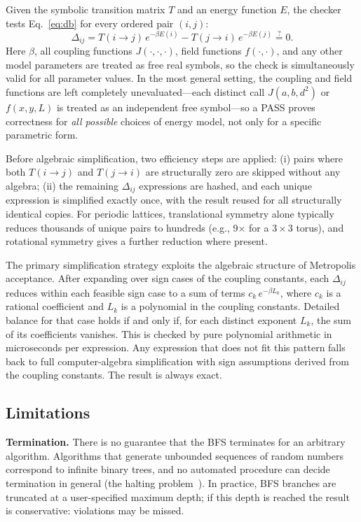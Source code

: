 \documentclass[twocolumn,10pt]{article}
\begin{document}
Given the symbolic transition matrix $T$ and an energy function $E$, the
checker tests Eq.~\eqref{eq:db} for every ordered pair $(i,j)$:
\begin{equation}
  \Delta_{ij} = T(i{\to}j)\,e^{-\beta E(i)} - T(j{\to}i)\,e^{-\beta E(j)}
  \stackrel{?}{=} 0.
  \label{eq:check}
\end{equation}
Here $\beta$, all coupling functions $J(\cdot,\cdot,\cdot)$, field functions
$f(\cdot,\cdot)$, and any other model parameters are treated as free real
symbols, so the check is simultaneously valid for all parameter values.  In the
most general setting, the coupling and field functions are left completely
unevaluated---each distinct call $J(a,b,d^2)$ or $f(x,y,L)$ is treated as an
independent free symbol---so a PASS proves correctness for \emph{all possible}
choices of energy model, not only for a specific parametric form.

Before algebraic simplification, two efficiency steps are applied: (i) pairs
where both $T(i\to j)$ and $T(j\to i)$ are structurally zero are skipped
without any algebra; (ii) the remaining $\Delta_{ij}$ expressions are hashed,
and each unique expression is simplified exactly once, with the result reused
for all structurally identical copies.  For periodic lattices, translational
symmetry alone typically reduces thousands of unique pairs to hundreds (e.g.,
9$\times$ for a $3\times3$ torus), and rotational symmetry gives a further
reduction where present.

The primary simplification strategy exploits the algebraic structure of
Metropolis acceptance.  After expanding over sign cases of the coupling
constants, each $\Delta_{ij}$ reduces within each feasible sign case to a sum
of terms $c_k\,e^{-\beta L_k}$, where $c_k$ is a rational coefficient and
$L_k$ is a polynomial in the coupling constants.  Detailed balance for that
case holds if and only if, for each distinct exponent $L_k$, the sum of its
coefficients vanishes.  This is checked by pure polynomial arithmetic in
microseconds per expression.  Any expression that does not fit this pattern
falls back to full computer-algebra simplification with sign assumptions
derived from the coupling constants.  The result is always exact.

\subsection{Limitations}
\label{sec:limitations}

\medskip\noindent\textbf{Termination.}
There is no guarantee that the BFS terminates for an arbitrary algorithm.
Algorithms that generate unbounded sequences of random numbers correspond to
infinite binary trees, and no automated procedure can decide termination in
general (the halting problem~\cite{Turing1936}).  In practice, BFS branches
are truncated at a user-specified maximum depth; if this depth is reached the
result is conservative: violations may be missed.
\end{document}
